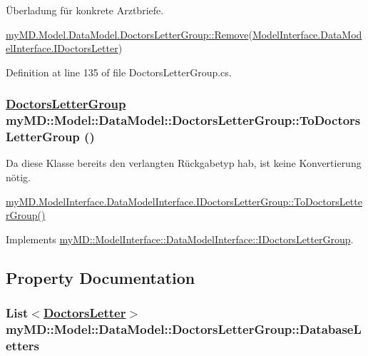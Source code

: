 \"{U}berladung f\"{u}r konkrete Arztbriefe. 

\hyperlink{classmy_m_d_1_1_model_1_1_data_model_1_1_doctors_letter_group_f605263c549fdd56e71759fcd7d2c552}{my\-MD.Model.Data\-Model.Doctors\-Letter\-Group::Remove}(\hyperlink{interfacemy_m_d_1_1_model_interface_1_1_data_model_interface_1_1_i_doctors_letter}{Model\-Interface.Data\-Model\-Interface.IDoctors\-Letter}) 

Definition at line 135 of file Doctors\-Letter\-Group.cs.\hypertarget{classmy_m_d_1_1_model_1_1_data_model_1_1_doctors_letter_group_6135e1709db8de80bcc0241d6d99880e}{
\subsubsection[ToDoctorsLetterGroup]{\setlength{\rightskip}{0pt plus 5cm}\hyperlink{classmy_m_d_1_1_model_1_1_data_model_1_1_doctors_letter_group}{Doctors\-Letter\-Group} my\-MD::Model::Data\-Model::Doctors\-Letter\-Group::To\-Doctors\-Letter\-Group ()}}
\label{db/dfe/classmy_m_d_1_1_model_1_1_data_model_1_1_doctors_letter_group_6135e1709db8de80bcc0241d6d99880e}


Da diese Klasse bereits den verlangten R\"{u}ckgabetyp hab, ist keine Konvertierung n\"{o}tig. 

\hyperlink{interfacemy_m_d_1_1_model_interface_1_1_data_model_interface_1_1_i_doctors_letter_group_6135e1709db8de80bcc0241d6d99880e}{my\-MD.Model\-Interface.Data\-Model\-Interface.IDoctors\-Letter\-Group::To\-Doctors\-Letter\-Group()} 

Implements \hyperlink{interfacemy_m_d_1_1_model_interface_1_1_data_model_interface_1_1_i_doctors_letter_group_6135e1709db8de80bcc0241d6d99880e}{my\-MD::Model\-Interface::Data\-Model\-Interface::IDoctors\-Letter\-Group}.

\subsection{Property Documentation}
\hypertarget{classmy_m_d_1_1_model_1_1_data_model_1_1_doctors_letter_group_df84ceb32ca80cc7fb3907b660899e4b}{
\subsubsection[DatabaseLetters]{\setlength{\rightskip}{0pt plus 5cm}List$<$\hyperlink{classmy_m_d_1_1_model_1_1_data_model_1_1_doctors_letter}{Doctors\-Letter}$>$ my\-MD::Model::Data\-Model::Doctors\-Letter\-Group::Database\-Letters}}
\label{db/dfe/classmy_m_d_1_1_model_1_1_data_model_1_1_doctors_letter_group_df84ceb32ca80cc7fb3907b660899e4b}


